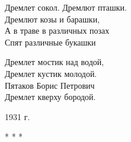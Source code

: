 \begin{center}
\begin{minipage}{0.4\textwidth}
Дремлет сокол. Дремлют пташки.\\
Дремлют козы и барашки,\\
А в траве в различных позах\\
Спят различные букашки\\
\end{minipage}
\end{center}

\begin{center}
\begin{minipage}{0.6\textwidth}
Дремлет мостик над водой,\\
Дремлет кустик молодой.\\
Пятаков Борис Петрович\\
Дремлет кверху бородой.\\
\end{minipage}
\end{center}

\begin{flushright} 1931 г. \end{flushright} 
\begin{center} * * * \end{center} 